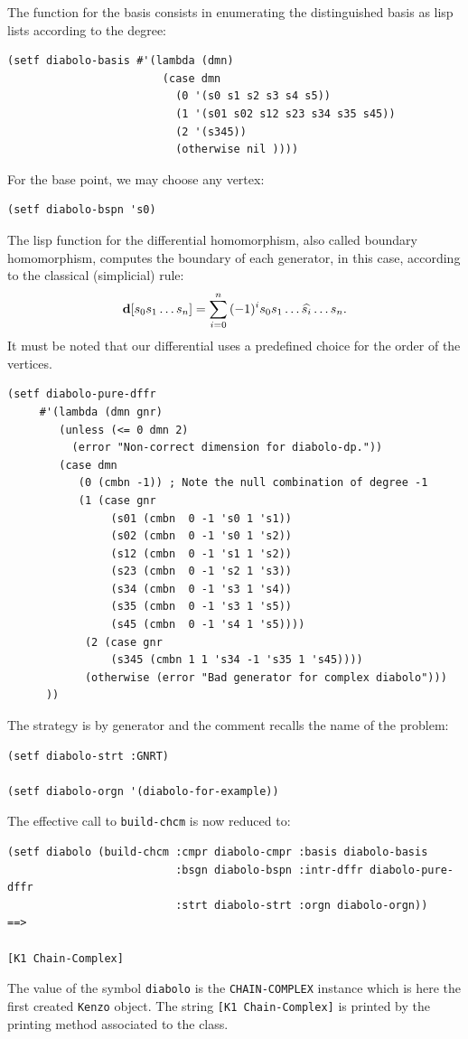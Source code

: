 The function for the basis consists  in enumerating the distinguished basis as lisp lists
according to the degree:
{\footnotesize\begin{verbatim}
(setf diabolo-basis #'(lambda (dmn)                         
                        (case dmn                           
                          (0 '(s0 s1 s2 s3 s4 s5))          
                          (1 '(s01 s02 s12 s23 s34 s35 s45))
                          (2 '(s345))
                          (otherwise nil ))))
\end{verbatim}}
For the base point, we may choose any vertex:
{\footnotesize\begin{verbatim}
(setf diabolo-bspn 's0)
\end{verbatim}}
The lisp function for the differential homomorphism, also called boundary homomorphism,
computes the boundary of each generator, in this case,  according to the classical (simplicial) rule:
$$ {\bf d}[{s_0s_1\ldots s_n}] = \sum_{i=0}^n{(-1)^is_0s_1\ldots\widehat{s_i}\ldots s_n}.$$
It must be noted that our differential uses a predefined choice for the order of the vertices.
{\footnotesize\begin{verbatim}
(setf diabolo-pure-dffr 
     #'(lambda (dmn gnr)                    
        (unless (<= 0 dmn 2)
          (error "Non-correct dimension for diabolo-dp."))
        (case dmn
           (0 (cmbn -1)) ; Note the null combination of degree -1
           (1 (case gnr
                (s01 (cmbn  0 -1 's0 1 's1))    
                (s02 (cmbn  0 -1 's0 1 's2))    
                (s12 (cmbn  0 -1 's1 1 's2))    
                (s23 (cmbn  0 -1 's2 1 's3))
                (s34 (cmbn  0 -1 's3 1 's4))
                (s35 (cmbn  0 -1 's3 1 's5))
                (s45 (cmbn  0 -1 's4 1 's5))))
            (2 (case gnr
                (s345 (cmbn 1 1 's34 -1 's35 1 's45))))
            (otherwise (error "Bad generator for complex diabolo")))
      ))
\end{verbatim}}
The  strategy is by generator and the comment recalls the name of the problem:
{\footnotesize\begin{verbatim}
(setf diabolo-strt :GNRT)        

(setf diabolo-orgn '(diabolo-for-example))  
\end{verbatim}}
The effective call to {\tt build-chcm} is now reduced to: 
{\footnotesize\begin{verbatim}
(setf diabolo (build-chcm :cmpr diabolo-cmpr :basis diabolo-basis
                          :bsgn diabolo-bspn :intr-dffr diabolo-pure-dffr
                          :strt diabolo-strt :orgn diabolo-orgn))       ==>

[K1 Chain-Complex]
\end{verbatim}}
The value of the symbol {\tt diabolo} is the {\tt CHAIN-COMPLEX}  instance which is here the first
created {\tt Kenzo} object. The string {\tt [K1 Chain-Complex]}
is printed by the printing method associated to the class. 


